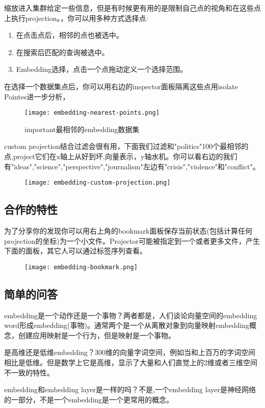 缩放进入集群给定一些信息，但是有时候更有用的是限制自己点的视角和在这些点上执行projection。，你可以用多种方式选择点:
\begin{enumerate}
	\item 在点击点后，相邻的点也被选中。
	\item 在搜索后匹配的查询被选中。
	\item Embedding选择，点击一个点拖动定义一个选择范围。
\end{enumerate}
在选择一个数据集点后，你可以用右边的inspector面板隔离这些点用isolate Pointes进一步分析，
\begin{figure}[H]
	\texttt{[image: embedding-nearest-points.png]}
	\caption{important最相邻的embedding数据集}
\end{figure}
custom projection结合过滤会很有用，下面我们过滤和"politics"100个最相邻的点,project它们在x轴上从好到坏,向量表示，y轴水机。你可以看右边的我们有"ideas","science",\newline "perspective","journalism"左边有"crisis","violence"和"conflict"。
\begin{figure}
\texttt{[image: embedding-custom-projection.png]}
\end{figure}

\subsection{合作的特性}
为了分享你的发现你可以用右上角的bookmark面板保存当前状态(包括计算任何projection的坐标)为一个小文件。Projector可能被指定到一个或者更多文件，产生下面的面板，其它人可以通过标签序列查看。
\begin{figure}[H]
	\texttt{[image: embedding-bookmark.png]}
\end{figure}
\subsection{简单的问答}
embedding是一个动作还是一个事物？两者都是，人们谈论向量空间的embedding word形成embedding(事物)。通常两个是一个从离散对象到向量映射embedding概念，创建应用映射是一个行为，但是映射是一个事物。

是高维还是低维embedding？300维的向量字词空间，例如当和上百万的字词空间相比是低维。但是数学上它是高维，显示了大量和人们直觉上的2维或者三维空间不一致的特性。

embedding和embedding layer是一样的吗？不是,一个embedding layer是神经网络的一部分，不是一个embedding是一个更常用的概念。
